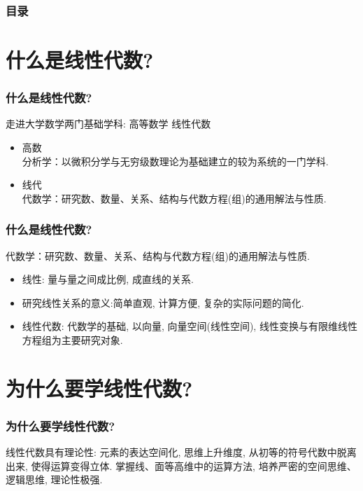 \documentclass{ctexbeamer}
\title{\TITLE}
\author{\AUTHOR}
\institute{\INSTITUTE}
\begin{document}

    \begin{frame}
        \titlepage
	\end{frame}
	
	
	\begin{frame}
		\frametitle{目录}
		\tableofcontents[pausesections]
	\end{frame}

	
	\section{什么是线性代数?}
	\begin{frame}
		\frametitle{什么是线性代数?}
		走进大学数学\quad  \pause  两门基础学科:  高等数学 \: 线性代数\pause
		\begin{itemize}
			\item 高数\\ 分析学：以微积分学与无穷级数理论为基础建立的较为系统的一门学科.\pause
			\item 线代\\ 代数学：研究数、数量、关系、结构与代数方程(组)的通用解法与性质.
		\end{itemize}
	\end{frame}

	\begin{frame}
	\frametitle{什么是线性代数?}
	代数学：研究数、数量、关系、结构与代数方程(组)的通用解法与性质.\pause
	\begin{itemize}
		\item 线性: 量与量之间成比例, 成直线的关系. \pause
		\item 研究线性关系的意义:简单直观, 计算方便, 复杂的实际问题的简化.\pause
		\item 线性代数: 代数学的基础, 以向量, 向量空间(线性空间), 线性变换与有限维线性方程组为主要研究对象. 
	\end{itemize}
	\end{frame}

	\section{为什么要学线性代数?}
	\begin{frame}
	\frametitle{为什么要学线性代数?}
		线性代数具有理论性: 元素的表达空间化, 思维上升维度, 从初等的符号代数中脱离出来, 使得运算变得立体. 掌握线、面等高维中的运算方法, 培养严密的空间思维、逻辑思维, 理论性极强.
	\end{frame}
\end{document}
